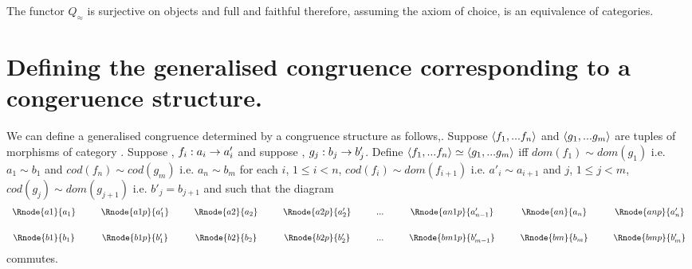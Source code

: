 \documentclass[10pt,a4paper]{article}
\theoremstyle{remark}
\begin{document}
The functor $Q_\approx$ is surjective on objects and full and faithful therefore, assuming the axiom of choice, is an equivalence of categories. 

\section{Defining  the generalised congruence corresponding to a congeruence structure.}



We can define a generalised congruence determined by a congruence structure as follows,.
Suppose 
$\langle f_1,...f_n\rangle$ and $\langle g_1,...g_m\rangle$ are tuples of morphisms of category \catc. Suppose 
\foreachi, $f_i:a_i \rightarrow a'_i$ and suppose \foreachj[m], $g_j: b_j \rightarrow b'_j$.
Define 
$\langle f_1,...f_n\rangle\simeq\langle g_1,...g_m\rangle$ iff $dom(f_1) \sim dom(g_1)$ i.e. $a_1 \sim b_1$ and
$cod(f_n) \sim cod(g_m)$ i.e. $a_n \sim b_m$
for each $i$, $1 \leq i <n$, $cod(f_i) \sim dom(f_{i+1})$ i.e.  $a'_i \sim a_{i+1}$
and $j$, $1 \leq j < m$, $cod(g_j) \sim dom(g_{j+1})$ i.e. $b'_j= b_{j+1}$ and such that
the diagram
\begin{equation*}
\begin{array}{cp{.3cm}cp{.3cm}cp{.3cm}cp{.3cm}cp{.3cm}cp{.3cm}cp{.3cm}c}
\Rnode{a1}{a_1} && \Rnode{a1p}{a'_1} && \Rnode{a2}{a_2} && \Rnode{a2p}{a'_2} && ... 
&&\Rnode{an1p}{a'_{n-1}}&&\Rnode{an}{a_n}&&\Rnode{anp}{a'_n}         \\ [0.6cm]
\Rnode{b1}{b_1} &&  \Rnode{b1p}{b'_1} && \Rnode{b2}{b_2} && \Rnode{b2p}{b'_2} && ... 
&&\Rnode{bm1p}{b'_{m-1}}&&\Rnode{bm}{b_m}&&\Rnode{bmp}{b'_m}                 
\end{array}
\end{equation*}
commutes.

 

\end{document}
